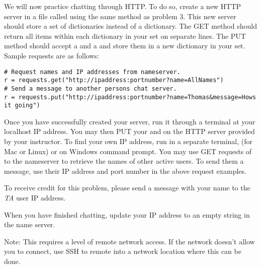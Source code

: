 \begin{problem}
We will now practice chatting through HTTP. 
To do so, create a new HTTP server in a file called  using the same method as problem 3.
This new server should store a set of dictionaries instead of a  dictionary. 
The GET method should return all items within each dictionary in your set on separate lines. 
The PUT method should accept a  and a  and store them in a new dictionary in your set. 
Sample requests are as follows:

\begin{lstlisting}
# Request names and IP addresses from nameserver.
r = requests.get("http://ipaddress:portnumber?name=AllNames")
# Send a message to another persons chat server.
r = requests.put("http://ipaddress:portnumber?name=Thomas&message=Hows it going")
\end{lstlisting}

Once you have successfully created your server, run it through a terminal at your localhost IP address. 
You may then PUT your  and  on the HTTP server provided by your instructor. 
To find your own IP address, run in a separate terminal,  (for Mac or Linux) or  on Windows command prompt. 
You may use GET requests of  to the nameserver to retrieve the names of other active users. 
To send them a message, use their IP address and port number in the above request examples. 

To receive credit for this problem, please send a message with your name to the \textit{TA} user IP address.

When you have finished chatting, update your IP address to an empty string in the name server.

Note: This requires a level of remote network access. If the network doesn't allow you to connect, use SSH to remote into a network location where this can be done.
\end{problem}
